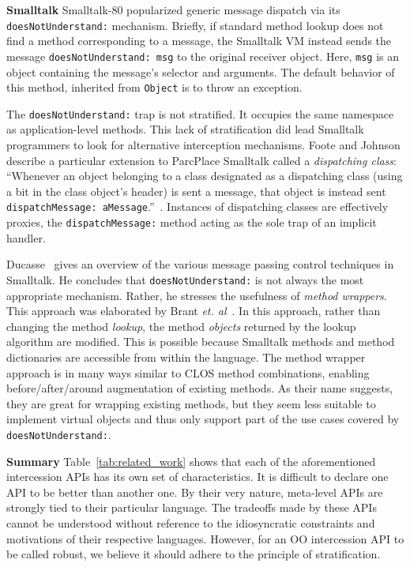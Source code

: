 \documentclass{sig-alternate}
\begin{document}
\textbf{Smalltalk} Smalltalk-80 popularized generic message dispatch via its \texttt{doesNotUnderstand:} mechanism. Briefly, if standard method lookup does not find a method corresponding to a message, the Smalltalk VM instead sends the message \texttt{doesNotUnderstand: msg} to the original receiver object. Here, \texttt{msg} is an object containing the message's selector and arguments. The default behavior of this method, inherited from \texttt{Object} is to throw an exception.

The \texttt{doesNotUnderstand:} trap is not stratified. It occupies the same namespace as application-level methods. This lack of stratification did lead Smalltalk programmers to look for alternative interception mechanisms. Foote and Johnson describe a particular extension to ParcPlace Smalltalk called a \emph{dispatching class}: ``Whenever an object belonging to a class designated as a dispatching class (using a bit in the class object's header) is sent a message, that object is instead sent \texttt{dispatchMessage: aMessage}.''~\cite{foote89reflective}. Instances of dispatching classes are effectively proxies, the \texttt{dispatchMessage:} method acting as the sole trap of an implicit handler.

Ducasse~\cite{ducasse99evaluatingmessage} gives an overview of the various message passing control techniques in Smalltalk. He concludes that \texttt{doesNotUnderstand:} is not always the most appropriate mechanism. Rather, he stresses the usefulness of \emph{method wrappers}. This approach was elaborated by Brant \emph{et. al}~\cite{brant98wrappers}. In this approach, rather than changing the method \emph{lookup}, the method \emph{objects} returned by the lookup algorithm are modified. This is possible because Smalltalk methods and method dictionaries are accessible from within the language. The method wrapper approach is in many ways similar to CLOS method combinations, enabling before/after/around augmentation of existing methods. As their name suggests, they are great for wrapping existing methods, but they seem less suitable to implement virtual objects and thus only support part of the use cases covered by \texttt{doesNotUnderstand:}.

\textbf{Summary} Table~\ref{tab:related_work} shows that each of the aforementioned intercession APIs has its own set of characteristics. It is difficult to declare one API to be better than another one. By their very nature, meta-level APIs are strongly tied to their particular language. The tradeoffs made by these APIs cannot be understood without reference to the idiosyncratic constraints and motivations of their respective languages. However, for an OO intercession API to be called robust, we believe it should adhere to the principle of stratification.
\end{document}
